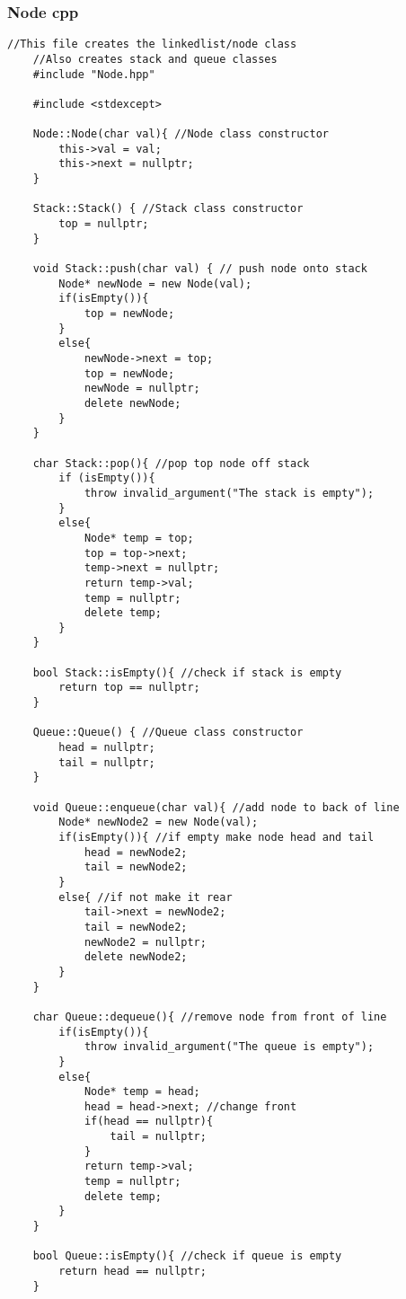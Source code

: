 \documentclass[letterpaper, 10pt,DIV=13]{scrartcl}
\numberwithin{equation}{section} %
\numberwithin{figure}{section} %
\numberwithin{table}{section} %
\begin{document}
\subsubsection*{Node cpp}
    \lstset{numbers=left, numberstyle=\tiny, stepnumber=1, numbersep=5pt, basicstyle=\footnotesize\ttfamily}
    \begin{lstlisting}[frame=single, ]
    //This file creates the linkedlist/node class
    //Also creates stack and queue classes
    #include "Node.hpp"
    
    #include <stdexcept>
    
    Node::Node(char val){ //Node class constructor
        this->val = val;
        this->next = nullptr;
    }
    
    Stack::Stack() { //Stack class constructor
        top = nullptr;
    }
    
    void Stack::push(char val) { // push node onto stack
        Node* newNode = new Node(val);
        if(isEmpty()){
            top = newNode;
        }
        else{
            newNode->next = top;
            top = newNode;
            newNode = nullptr;
            delete newNode;
        }
    }
    
    char Stack::pop(){ //pop top node off stack
        if (isEmpty()){
            throw invalid_argument("The stack is empty");
        }
        else{
            Node* temp = top;
            top = top->next;
            temp->next = nullptr;
            return temp->val;
            temp = nullptr;
            delete temp;
        }
    }
    
    bool Stack::isEmpty(){ //check if stack is empty
        return top == nullptr;
    }
    
    Queue::Queue() { //Queue class constructor
        head = nullptr;
        tail = nullptr;
    }
    
    void Queue::enqueue(char val){ //add node to back of line
        Node* newNode2 = new Node(val);
        if(isEmpty()){ //if empty make node head and tail
            head = newNode2;
            tail = newNode2;
        }
        else{ //if not make it rear
            tail->next = newNode2;
            tail = newNode2;
            newNode2 = nullptr;
            delete newNode2;
        }
    }
    
    char Queue::dequeue(){ //remove node from front of line
        if(isEmpty()){
            throw invalid_argument("The queue is empty");
        }
        else{
            Node* temp = head;
            head = head->next; //change front
            if(head == nullptr){
                tail = nullptr;
            }
            return temp->val;
            temp = nullptr;
            delete temp;
        }
    }
    
    bool Queue::isEmpty(){ //check if queue is empty
        return head == nullptr;
    }
    
\end{lstlisting}
\end{document}
